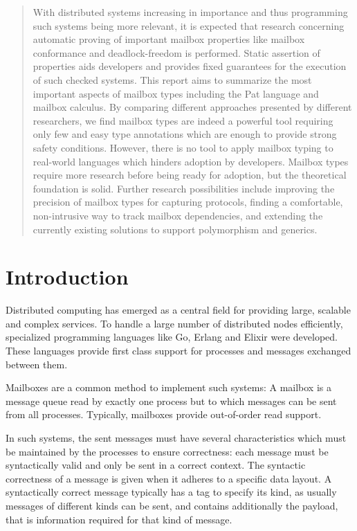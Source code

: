 
\begin{abstract}

With distributed systems increasing in importance and thus programming such systems being more relevant, it is expected that research concerning automatic proving of important mailbox properties like mailbox conformance and deadlock-freedom is performed. Static assertion of properties aids developers and provides fixed guarantees for the execution of such checked systems. This report aims to summarize the most important aspects of mailbox types including the Pat language and mailbox calculus. By comparing different approaches presented by different researchers, we find mailbox types are indeed a powerful tool requiring only few and easy type annotations which are enough to provide strong safety conditions. However, there is no tool to apply mailbox typing to real-world languages which hinders adoption by developers. Mailbox types require more research before being ready for adoption, but the theoretical foundation is solid. Further research possibilities include improving the precision of mailbox types for capturing protocols, finding a comfortable, non-intrusive way to track mailbox dependencies, and extending the currently existing solutions to support polymorphism and generics.

\end{abstract}



\section{Introduction}
\label{sec:introduction}

Distributed computing has emerged as a central field for providing large, scalable and complex services.
To handle a large number of distributed nodes efficiently, specialized programming languages like Go, Erlang and Elixir were developed.
These languages provide first class support for processes and messages exchanged between them.

Mailboxes are a common method to implement such systems: A mailbox is a message queue read by exactly one process but to which messages can be sent from all processes.
Typically, mailboxes provide out-of-order read support.

In such systems, the sent messages must have several characteristics which must be maintained by the processes to ensure correctness: each message must be syntactically valid and only be sent in a correct context.
The syntactic correctness of a message is given when it adheres to a specific data layout.
A syntactically correct message typically has a tag to specify its kind, as usually messages of different kinds can be sent, and contains additionally the payload, that is information required for that kind of message.

